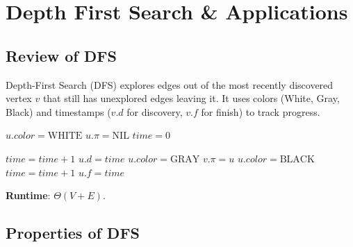 \documentclass[12pt]{article}
\theoremstyle{blueplain}
\theoremstyle{bluedef}
\theoremstyle{blueremark}
\begin{document}
\clearpage


\section{Depth First Search \& Applications}

\subsection{Review of DFS}

Depth-First Search (DFS) explores edges out of the most recently discovered vertex $v$ that still has unexplored edges leaving it. It uses colors (White, Gray, Black) and timestamps ($v.d$ for discovery, $v.f$ for finish) to track progress.

\begin{algorithm}
    \caption{Depth-First Search}\label{alg:dfsRevisit}
    \begin{algorithmic}[1]
        \State $u.color = \text{WHITE}$
        \State $u.\pi = \text{NIL}$
        \EndFor
        \State $time = 0$
        \State {}
        \EndIf
        \EndFor
        \EndProcedure
    \end{algorithmic}
\end{algorithm}

\begin{algorithm}
    \caption{DFS-Visit}\label{alg:dfsVisit}
    \begin{algorithmic}[1]
        \State $time = time + 1$
        \State $u.d = time$
        \State $u.color = \text{GRAY}$
        \State $v.\pi = u$
        \State {}
        \EndIf
        \EndFor
        \State $u.color = \text{BLACK}$
        \State $time = time + 1$
        \State $u.f = time$
        \EndProcedure
    \end{algorithmic}
\end{algorithm}

\textbf{Runtime}: $\Theta(V + E)$.

\subsection{Properties of DFS}
\end{document}
